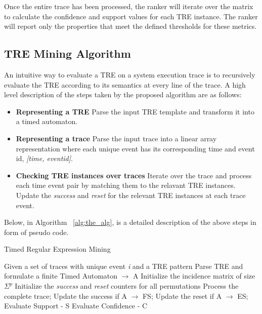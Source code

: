 \documentclass[]{sigplanconf}
\begin{document}
Once the entire trace has been processed, the ranker will iterate over the matrix to calculate the confidence and support values for each TRE instance. The ranker will report only the properties that meet the defined thresholds for these metrics.

\subsection{TRE Mining Algorithm}

An intuitive way to evaluate a TRE on a system execution trace is to recursively evaluate the TRE according to its semantics at every line of the trace. A high level description of the steps taken by the proposed algorithm are as follows:

\begin{itemize}
\item \textbf{Representing a TRE} Parse the input TRE template and transform it into a timed automaton.
\item \textbf{Representing a trace} Parse the input trace into a linear array representation where each unique event has its corresponding time and event id, \emph{[time, eventid]}.
\item \textbf{Checking TRE instances over traces} Iterate over the trace and process each time event pair by matching them to the relavant TRE instances. Update the \emph{success} and \emph{reset} for the relevant TRE instances at each trace event.
\end{itemize}

Below, in Algorithm ~\ref{alg:the_alg}, is a detailed description of the above steps in form of pseudo code.

\begin{algorithm}[h]
    \caption{Timed Regular Expression Mining}\label{alg:the_alg}
    \begin{algorithmic}[1]
     \Require  Given a set of traces with unique event \emph{i} and a TRE pattern
     \Ensure Parse TRE and formulate a finite Timed Automaton $\rightarrow$ A
     \State Initialize the incidence matrix of size $\Sigma^p$
     \State Initialize the \emph{success} and \emph{reset} counters for all permutations
        \State Process the complete trace;
        \State Update the success if A $\rightarrow$ FS;
        \State Update the reset if A $\rightarrow$ ES;
     \EndFor
     \State Evaluate Support - S
     \State Evaluate Confidence - C
    \end{algorithmic}
\end{algorithm}
\end{document}
